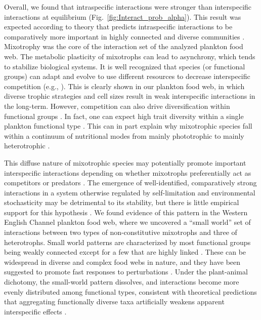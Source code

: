 \documentclass[12pt]{article}
\begin{document}
Overall, we found that intraspecific interactions were stronger than interspecific interactions at equilibrium (Fig.~\ref{fig:Interact_prob_alpha}). This result was expected according to theory that predicts intraspecific interactions to be comparatively more important in highly connected and diverse communities \citep{Barabas2016}. Mixotrophy was the core of the interaction set of the analyzed plankton food web. The metabolic plasticity of mixotrophs can lead to asynchrony, which tends to stabilize biological systems. It is well recognized that species (or functional groups) can adapt and evolve to use different resources to decrease interspecific competition (e.g., \citealp{Moosmann2021}). This is clearly shown in our plankton food web, in which diverse trophic strategies and cell sizes result in weak interspecific interactions in the long-term. However, competition can also drive diversification within functional groups \citep{Svanback2007}. In fact, one can expect high trait diversity within a single plankton functional type \citep{Kruk2010,Kruk2011,Irwin2015}. This can in part explain why mixotrophic species fall within a continuum of nutritional modes from mainly phototrophic to mainly heterotrophic \citep{Stoecker2016}.

This diffuse nature of mixotrophic species may potentially promote important interspecific interactions depending on whether mixotrophs preferentially act as competitors or predators \citep{tittel2003mixotrophs}. The emergence of well-identified, comparatively strong interactions in a system otherwise regulated by self-limitation and environmental stochasticity may be detrimental to its stability, but there is little empirical support for this hypothesis \citep{McCann1998,Neutel2002}. We found evidence of this pattern in the Western English Channel plankton food web, where we uncovered a ``small world'' set of interactions between two types of non-constitutive mixotrophs and three of heterotrophs. Small world patterns are characterized by most functional groups being weakly connected except for a few that are highly linked \citep{Dunne2002,Sinha2005}. These can be widespread in diverse and complex food webs in nature, and they have been suggested to promote fast responses to perturbations \citep{Montoya2003}. Under the plant-animal dichotomy, the small-world pattern dissolves, and interactions become more evenly distributed among functional types, consistent with theoretical predictions that aggregating functionally diverse taxa artificially weakens apparent interspecific effects \citep{Barabas2016}.
\end{document}
